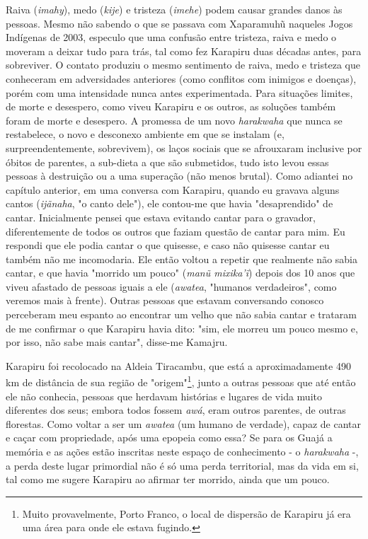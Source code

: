 Raiva (\emph{imahy}), medo (\emph{kije}) e tristeza (\emph{imehe}) podem
causar grandes danos às pessoas. Mesmo não sabendo o que se passava com
Xaparamuhũ naqueles Jogos Indígenas de 2003, especulo que uma confusão
entre tristeza, raiva e medo o moveram a deixar tudo para trás, tal como
fez Karapiru duas décadas antes, para sobreviver. O contato produziu o
mesmo sentimento de raiva, medo e tristeza que conheceram em
adversidades anteriores (como conflitos com inimigos e doenças), porém
com uma intensidade nunca antes experimentada. Para situações limites,
de morte e desespero, como viveu Karapiru e os outros, as soluções
também foram de morte e desespero. A promessa de um novo
\emph{harakwaha} que nunca se restabelece, o novo e desconexo ambiente
em que se instalam (e, surpreendentemente, sobrevivem), os laços sociais
que se afrouxaram inclusive por óbitos de parentes, a sub-dieta a que
são submetidos, tudo isto levou essas pessoas à destruição ou a uma
superação (não menos brutal). Como adiantei no capítulo anterior, em uma
conversa com Karapiru, quando eu gravava alguns cantos (\emph{ijãnaha},
"o canto dele"), ele contou-me que havia "desaprendido" de cantar.
Inicialmente pensei que estava evitando cantar para o gravador,
diferentemente de todos os outros que faziam questão de cantar para mim.
Eu respondi que ele podia cantar o que quisesse, e caso não quisesse
cantar eu também não me incomodaria. Ele então voltou a repetir que
realmente não sabia cantar, e que havia "morrido um pouco" (\emph{manũ
mixika'ĩ}) depois dos 10 anos que viveu afastado de pessoas iguais a ele
(\emph{awatea}, "humanos verdadeiros", como veremos mais à frente).
Outras pessoas que estavam conversando conosco perceberam meu espanto ao
encontrar um velho que não sabia cantar e trataram de me confirmar o que
Karapiru havia dito: "sim, ele morreu um pouco mesmo e, por isso, não
sabe mais cantar", disse-me Kamajru.

Karapiru foi recolocado na Aldeia Tiracambu, que está a aproximadamente
490 km de distância de sua região de "origem"\footnote{Muito
  provavelmente, Porto Franco, o local de dispersão de Karapiru já era
  uma área para onde ele estava fugindo.}, junto a outras pessoas que
até então ele não conhecia, pessoas que herdavam histórias e lugares de
vida muito diferentes dos seus; embora todos fossem \emph{awá}, eram
outros parentes, de outras florestas. Como voltar a ser um \emph{awatea}
(um humano de verdade), capaz de cantar e caçar com propriedade, após
uma epopeia como essa? Se para os Guajá a memória e as ações estão
inscritas neste espaço de conhecimento - o \emph{harakwaha} -, a perda
deste lugar primordial não é só uma perda territorial, mas da vida em
si, tal como me sugere Karapiru ao afirmar ter morrido, ainda que um
pouco.

